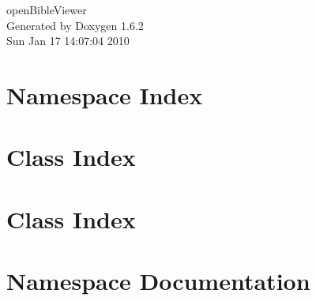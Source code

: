 \documentclass[a4paper]{book}
\begin{document}
\hypersetup{pageanchor=false}
\begin{titlepage}
\vspace*{7cm}
\begin{center}
{\Large openBibleViewer }\\
\vspace*{1cm}
{\large Generated by Doxygen 1.6.2}\\
\vspace*{0.5cm}
{\small Sun Jan 17 14:07:04 2010}\\
\end{center}
\end{titlepage}
\clearemptydoublepage
{}
\tableofcontents
\clearemptydoublepage
{}
\hypersetup{pageanchor=true}
\chapter{Namespace Index}

\chapter{Class Index}

\chapter{Class Index}

\chapter{Namespace Documentation}

\end{document}
